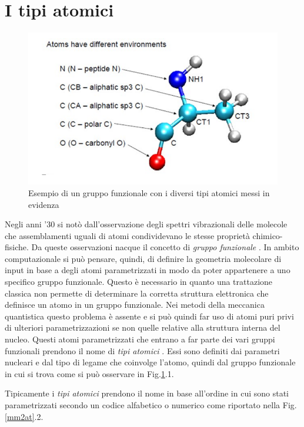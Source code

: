 \documentclass[oneside]{amsbook}
\numberwithin{section}{chapter}
\numberwithin{equation}{section}
\numberwithin{figure}{section}
\begin{document}
\section{I tipi atomici}
\begin{figure} 
\label{atomty}
\centering
\caption{Esempio di un gruppo funzionale con i diversi tipi atomici  messi in evidenza}
\includegraphics[scale=0.3]{tipiAtomici}
\end{figure}
Negli anni '30 si notò dall'osservazione degli spettri vibrazionali delle molecole che assemblamenti uguali di atomi condividevano le stesse proprietà chimico-fisiche. Da queste osservazioni nacque il concetto di \emph{gruppo funzionale} . In ambito computazionale si può pensare, quindi, di definire la geometria molecolare di input in base a degli atomi parametrizzati in modo da poter appartenere a uno specifico gruppo funzionale. Questo è necessario in quanto una trattazione classica non permette di determinare la corretta struttura elettronica che definisce un atomo in un gruppo funzionale. Nei metodi della meccanica quantistica questo problema è assente e si può quindi far uso di atomi puri privi di ulteriori parametrizzazioni se non quelle relative alla struttura interna del nucleo.
Questi atomi parametrizzati che entrano a far parte dei vari gruppi funzionali prendono il nome di \emph{tipi atomici} . Essi sono definiti dai parametri nucleari e dal tipo di legame che coinvolge l'atomo, quindi dal gruppo funzionale in cui si trova come si può osservare in Fig.\ref{atomty}.1.

Tipicamente i \emph{tipi atomici} prendono il nome in base all'ordine in cui sono stati parametrizzati secondo un codice alfabetico o numerico come riportato nella Fig.\ref{mm2at}.2.
\end{document}
